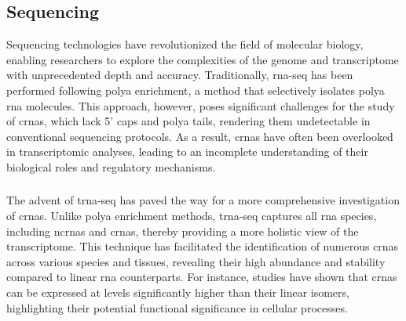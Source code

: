 \subsection{Sequencing }

Sequencing technologies have revolutionized the field of molecular biology,
enabling researchers to explore the complexities of the genome and
transcriptome with unprecedented depth and accuracy.
Traditionally, \gls{rna-seq} has been performed following \gls{polya}
enrichment, a method that selectively isolates \gls{polya} \gls{rna} molecules.
This approach, however, poses significant challenges for the study of
\glspl{crna}, which lack 5' caps and \gls{polya} tails, rendering them
undetectable in conventional sequencing protocols\supercite{guo_expanded_2014}.
As a result, \glspl{crna} have often been overlooked in transcriptomic
analyses, leading to an incomplete understanding of their biological roles and
regulatory mechanisms.

\subsubsection{}
The advent of \gls{trna-seq} has paved the way for a more comprehensive
investigation of \glspl{crna}.
Unlike \gls{polya} enrichment methods, \gls{trna-seq} captures all \gls{rna}
species, including \glspl{ncrna} and \glspl{crna}, thereby providing a more
holistic view of the transcriptome\supercite{panda_identification_2017}.
This technique has facilitated the identification of numerous \glspl{crna}
across various species and tissues, revealing their high abundance and
stability compared to linear \gls{rna}
counterparts\supercite{liu_circular_2016,cao_expression_2018}.
For instance, studies have shown that \glspl{crna} can be expressed at levels
significantly higher than their linear isomers, highlighting their potential
functional significance in cellular processes\supercite{liu_circular_2016}.

